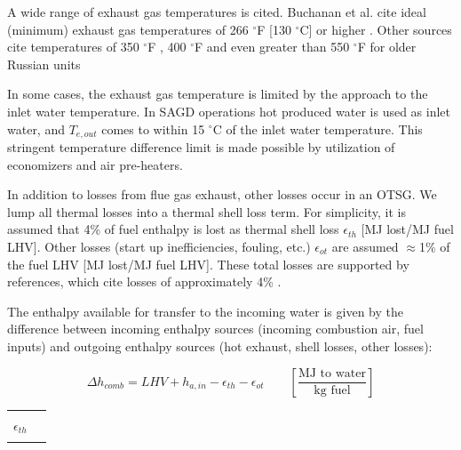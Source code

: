 \documentclass[11pt]{report}
\newcommand{\xlname}[1]{\raisebox{1pt}{\fcolorbox{light-gray}{light-gray}{\texttt{\textcolor{stanford}{\scriptsize{#1}}}}}}
\newcommand{\eqnunitfrac}[2]{\quad\quad \scriptstyle{\left[\frac{\text{#1}}{\text{#2}}\right]}}
\begin{document}
A wide range of exhaust gas temperatures is cited. Buchanan et al. cite ideal (minimum) exhaust gas temperatures of 266 $^\circ$F [130 $^\circ$C] or higher \cite[p. 78]{Buchanan2009}. Other sources cite temperatures of 350 $^\circ$F \cite[p. 36]{Donaldson1989}, 400 $^\circ$F \cite[p. 227]{Chilingarian1987} and even greater than 550 $^\circ$F for older Russian units \cite[p. 181]{Baibakov1989} 

In some cases, the exhaust gas temperature is limited by the approach to the inlet water temperature. In SAGD operations hot produced water is used as inlet water, and $T_{e,out}$ comes to within 15 $^\circ$C of the inlet water temperature. This stringent temperature difference limit is made possible by utilization of economizers and air pre-heaters.

In addition to losses from flue gas exhaust, other losses occur in an OTSG. We lump all thermal losses into a thermal shell loss term. For simplicity, it is assumed that 4\% of fuel enthalpy is lost as thermal shell loss $\epsilon_{th}$ [MJ lost/MJ fuel LHV]. Other losses (start up inefficiencies, fouling, etc.) $\epsilon_{ot}$ are assumed $\approx$1\% of the fuel LHV [MJ lost/MJ fuel LHV]. These total losses are supported by references, which cite losses of approximately 4\% \cite{Ganapathy2003}.

The enthalpy available for transfer to the incoming water is given by the difference between incoming enthalpy sources (incoming combustion air, fuel inputs) and outgoing enthalpy sources (hot exhaust, shell losses, other losses):

\begin{minipage}{0.7\columnwidth}
\begin{fleqn}[0pt]
\begin{equation}\label{eq:steam_hcomb}
\Delta h_{comb} = LHV+h_{a,in}-\epsilon_{th}-\epsilon_{ot} \eqnunitfrac{MJ to water}{kg fuel}
\end{equation}
\end{fleqn}
\end{minipage}\hfill
\begin{minipage}{0.2\columnwidth}
        \begin{tabular}{|cl}
                        & \\
        $\epsilon_{th}$       & \xlname{Loss\_shell\_OTSG}\\
                        & \\
        \end{tabular}
\end{minipage}
\end{document}
